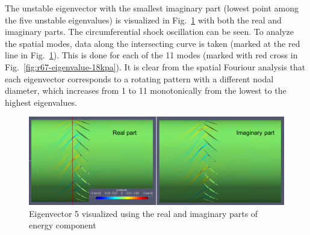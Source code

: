 \documentclass[journal,final]{new-aiaa}
\begin{document}
The unstable eigenvector with the smallest imaginary part (lowest point among the
five unstable eigenvalues) is visualized in Fig.~\ref{fig:r67-eigenvector-18kpa} with
both the real and imaginary parts. The circumferential shock
oscillation can be seen. To analyze the spatial modes, data along
the intersecting curve is taken (marked at the red line in
Fig.~\ref{fig:r67-eigenvector-18kpa}). This is done for
each of the 11 modes (marked with red cross in Fig.~\ref{fig:r67-eigenvalue-18kpa}).
It is clear from the spatial Fouriour analysis
that each eigenvector corresponds to a rotating pattern with a different
nodal diameter, which increases from 1 to 11 monotonically from the lowest
to the highest eigenvalues.

\begin{figure}[htb]
	\centering   
	\includegraphics[width=.6\textwidth]{pic/mode-with-nd5.png}
	\caption{Eigenvector 5 visualized using the real and imaginary parts
		of energy component}
	\label{fig:r67-eigenvector-18kpa}
\end{figure}

\end{document}
